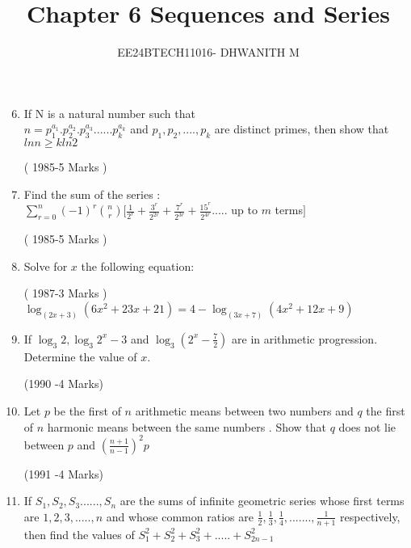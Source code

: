 \documentclass[journal,12pt,twocolumn]{IEEEtran}
\theoremstyle{remark}
\begin{document}

\vspace{3cm}

\title{Chapter 6 Sequences and Series}
\author{EE24BTECH11016- DHWANITH M}
\maketitle
\newpage
\bigskip

\renewcommand{\thefigure}{\theenumi}
\renewcommand{\thetable}{\theenumi}


\begin{enumerate}
    \setcounter{enumi}{5}
    \item If N is a natural number such that
\\ 
$n= p_{1}^{a_1}.p_{2}^{a_2}.p_{3}^{a_3}......p_{k}^{a_k} $ and $ p_{1},p_{2},....,p_{k} $ are distinct primes, then show that $ ln n \geq k ln2 $                              
     
       \hfill( 1985-5 Marks )             


    \item Find the sum of the series : \\          $\sum_{r=0}^{n} (-1)^r \binom{n}{r}[\frac{1}{2^{r}}+\frac{3^{r}}{2^{2r}}+\frac{7^{r}}{2^{3r}}+\frac{15^{r}}{2^{4r}}.....$ up to $m$ terms$ ] $  
	    
		    \hfill( 1985-5 Marks )
	    
     \item Solve for $x$ the following equation:     
     
      \hfill( 1987-3 Marks )          \\              
		     $   \log_{(2x+3)}{(6x^{2}+23x+21)}=4-\log_{(3x+7)}{(4x^{2}+12x+9)} $

      \item If $ \log_{3}{2},\log_{3}{2^{x}-3} $ and $ \log_{3}{(2^{x}-\frac{7}{2})} $ are in arithmetic progression. Determine the value of $x$.  
     
       \hfill(1990 -4 Marks)
      

      \item Let $p$ be the first of $n$ arithmetic means between two numbers and $q$ the first of $n$ harmonic means between the same numbers . Show that $q$ does not lie between $p$ and $(\frac{n+1}{n-1})^{2}p$ 
       
      \hfill(1991 -4 Marks)
      

      \item  If $ S_1,S_2,S_3......,S_n $ are the sums of infinite geometric series whose first terms are $1,2,3,.....,n$ and whose common ratios are $ \frac{1}{2},\frac{1}{3},\frac{1}{4},.......,\frac{1}{n+1} $ respectively, then find the values of $ S_{1}^{2}+S_{2}^{2}+S_{3}^{2}+.....+S_{2n-1}^{2} $
      

\end{enumerate}
\end{document}
